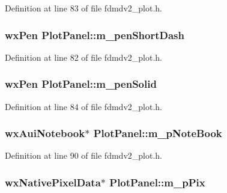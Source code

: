 Definition at line 83 of file fdmdv2\-\_\-plot.\-h.

\hypertarget{class_plot_panel_a111adb0975870b5d448da832bd44fc99}{
\subsubsection[{m\-\_\-pen\-Short\-Dash}]{\setlength{\rightskip}{0pt plus 5cm}wx\-Pen Plot\-Panel\-::m\-\_\-pen\-Short\-Dash}}\label{class_plot_panel_a111adb0975870b5d448da832bd44fc99}


Definition at line 82 of file fdmdv2\-\_\-plot.\-h.

\hypertarget{class_plot_panel_a229628c08bb7d0fa16589dbf83d635d1}{
\subsubsection[{m\-\_\-pen\-Solid}]{\setlength{\rightskip}{0pt plus 5cm}wx\-Pen Plot\-Panel\-::m\-\_\-pen\-Solid}}\label{class_plot_panel_a229628c08bb7d0fa16589dbf83d635d1}


Definition at line 84 of file fdmdv2\-\_\-plot.\-h.

\hypertarget{class_plot_panel_a63b99d2f75a6486dda96f4934ba369fa}{
\subsubsection[{m\-\_\-p\-Note\-Book}]{\setlength{\rightskip}{0pt plus 5cm}wx\-Aui\-Notebook$\ast$ Plot\-Panel\-::m\-\_\-p\-Note\-Book}}\label{class_plot_panel_a63b99d2f75a6486dda96f4934ba369fa}


Definition at line 90 of file fdmdv2\-\_\-plot.\-h.

\hypertarget{class_plot_panel_abba680c266caf80a5a3f2ab98cbb7796}{
\subsubsection[{m\-\_\-p\-Pix}]{\setlength{\rightskip}{0pt plus 5cm}wx\-Native\-Pixel\-Data$\ast$ Plot\-Panel\-::m\-\_\-p\-Pix}}\label{class_plot_panel_abba680c266caf80a5a3f2ab98cbb7796}


